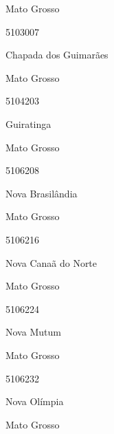 \documentclass[
  letterpaper,
]{report}
\begin{document}
\n    

\n      

Mato Grosso

\n      

5103007

\n      

Chapada dos Guimarães

\n    

\n    

\n      

Mato Grosso

\n      

5104203

\n      

Guiratinga

\n    

\n    

\n      

Mato Grosso

\n      

5106208

\n      

Nova Brasilândia

\n    

\n    

\n      

Mato Grosso

\n      

5106216

\n      

Nova Canaã do Norte

\n    

\n    

\n      

Mato Grosso

\n      

5106224

\n      

Nova Mutum

\n    

\n    

\n      

Mato Grosso

\n      

5106232

\n      

Nova Olímpia

\n    

\n    

\n      

Mato Grosso

\n      
\end{document}
